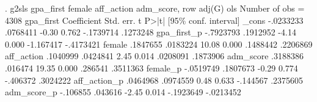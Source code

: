 . g2sls gpa_first female aff_action adm_score, row adj(G) ols
{\smallskip}
                                                  Number of obs =       4308
   gpa_first {\VBAR} Coefficient  Std. err.      t    P>|t|     [95\% conf. interval]
       _cons {\VBAR}  -.0233233   .0768411    -0.30   0.762    -.1739714    .1273248
 gpa_first_p {\VBAR}  -.7923793   .1912952    -4.14   0.000    -1.167417   -.4173421
      female {\VBAR}   .1847655   .0183224    10.08   0.000     .1488442    .2206869
  aff_action {\VBAR}   .1040999   .0424841     2.45   0.014     .0208091    .1873906
   adm_score {\VBAR}   .3188386    .016474    19.35   0.000      .286541    .3511363
    female_p {\VBAR}  -.0519749   .1807673    -0.29   0.774     -.406372    .3024222
aff_action_p {\VBAR}   .0464968   .0974559     0.48   0.633     -.144567    .2375605
 adm_score_p {\VBAR}   -.106855    .043616    -2.45   0.014    -.1923649   -.0213452
